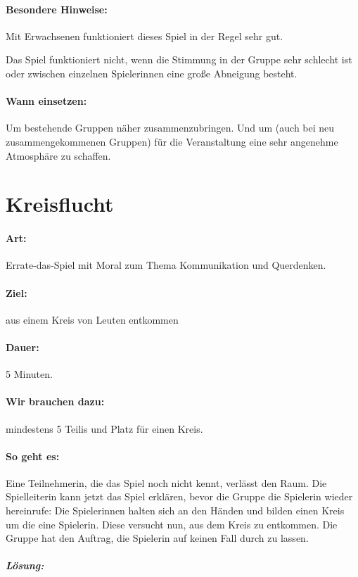 \paragraph{Besondere Hinweise:} Mit Erwachsenen funktioniert dieses Spiel in der Regel sehr gut.

Das Spiel funktioniert nicht, wenn die Stimmung in der Gruppe sehr schlecht ist oder zwischen einzelnen Spielerinnen eine große Abneigung besteht.
\paragraph{Wann einsetzen:} Um bestehende Gruppen näher zusammenzubringen. Und um (auch bei neu zusammengekommenen Gruppen) für die Veranstaltung eine sehr angenehme Atmosphäre zu schaffen.

\section{Kreisflucht}
\paragraph{Art:} Errate-das-Spiel mit Moral zum Thema Kommunikation und Querdenken.
\paragraph{Ziel:} aus einem Kreis von Leuten entkommen
\paragraph{Dauer:} 5 Minuten.
\paragraph{Wir brauchen dazu:} mindestens 5 Teilis und Platz für einen Kreis.
\paragraph{So geht es:} Eine Teilnehmerin, die das Spiel noch nicht kennt, verlässt den Raum. Die Spielleiterin kann jetzt das Spiel erklären, bevor die Gruppe die Spielerin wieder hereinrufe: Die Spielerinnen halten sich an den Händen und bilden einen Kreis um die eine Spielerin. Diese versucht nun, aus dem Kreis zu entkommen. Die Gruppe hat den Auftrag, die Spielerin auf keinen Fall durch zu lassen.

\subparagraph{Lösung:}

